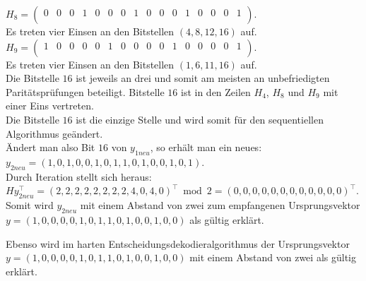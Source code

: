 \begin{Beispiel}
    
    $H_8= \left( \begin{array}{rrrrrrrrrrrrrrrr}
        0 & 0 & 0 & 1 & 0 & 0 & 0 & 1 & 0 & 0 & 0 & 1 & 0 & 0 & 0 & 1 \\
       \end{array}\right). 
    $\\
    Es treten vier Einsen an den Bitstellen $(4, 8, 12, 16)$ auf.\\
    
    $H_9= \left( \begin{array}{rrrrrrrrrrrrrrrr}
        1 & 0 & 0 & 0 & 0 & 1 & 0 & 0 & 0 & 0 & 1 & 0 & 0 & 0 & 0 & 1 \\
       \end{array}\right). 
    $\\
    Es treten vier Einsen an den Bitstellen $(1, 6, 11, 16)$ auf.\\
    
    Die Bitstelle $16$ ist jeweils an drei und somit am meisten an unbefriedigten Paritätsprüfungen beteiligt.
    Bitstelle $16$ ist in den Zeilen $H_4$, $H_8$ und $H_9$ mit einer Eins vertreten.\\
    Die Bitstelle $16$ ist die einzige Stelle und wird somit für den sequentiellen Algorithmus geändert.\\
    
    Ändert man also Bit $16$ von $y_{1neu}$, so erhält man ein neues:\\
    $y_{2neu} = (1,0,1,0,0,1,0,1,1,0,1,0,0,1,0,1).$\\
    
    Durch Iteration stellt sich heraus:\\
    $Hy_{2neu}^\intercal = (2,2,2,2,2,2,2,2,4,0,4,0)^\intercal \bmod 2 = (0,0,0,0,0,0,0,0,0,0,0,0)^\intercal$.\\
    
    Somit wird $y_{2neu}$ mit einem Abstand von zwei zum empfangenen Ursprungsvektor $y = (1,0,0,0,0,1,0,1,1,0,1,0,0,1,0,0)$ als gültig erklärt.
    
    Ebenso wird im harten Entscheidungsdekodieralgorithmus der Ursprungsvektor\\
    $y = (1,0,0,0,0,1,0,1,1,0,1,0,0,1,0,0)$ mit einem Abstand von zwei als gültig erklärt.\\
    
\end{Beispiel}



